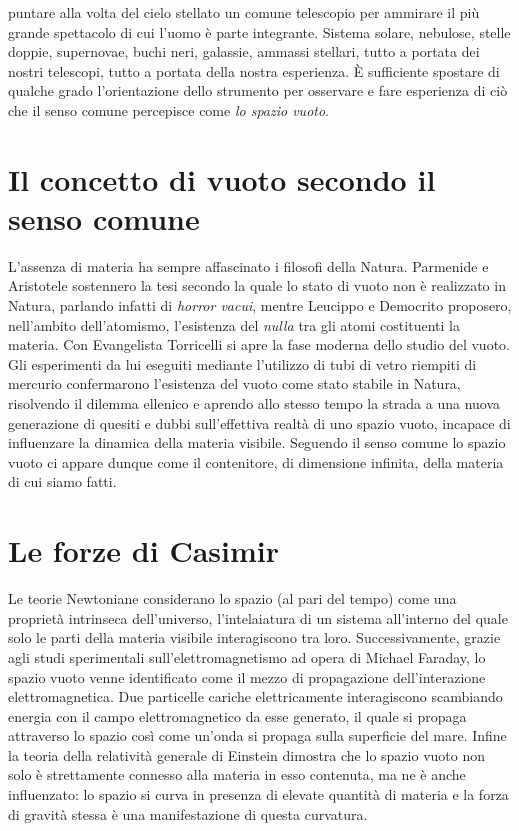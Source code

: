  puntare alla volta del cielo stellato un comune telescopio per ammirare il più grande spettacolo di cui l'uomo è parte integrante. Sistema solare, nebulose, stelle doppie, supernovae, buchi neri, galassie, ammassi stellari, tutto a portata dei nostri telescopi, tutto a portata della nostra esperienza. 
È sufficiente spostare di qualche grado l'orientazione dello strumento per osservare e fare esperienza di ciò che il senso comune percepisce come \emph{lo spazio vuoto}.

\section*{Il concetto di vuoto secondo il senso comune}
L'assenza di materia ha sempre affascinato i filosofi della Natura. Parmenide e Aristotele sostennero la tesi secondo la quale lo stato di vuoto non è realizzato in Natura, parlando infatti di \emph{horror vacui}, mentre Leucippo e Democrito proposero, nell'ambito dell'atomismo, l'esistenza del \emph{nulla} tra gli atomi costituenti la materia. Con Evangelista Torricelli si apre la fase moderna dello studio del vuoto. Gli esperimenti da lui eseguiti mediante l'utilizzo di tubi di vetro riempiti di mercurio confermarono l'esistenza del vuoto come stato stabile in Natura, risolvendo il dilemma ellenico e aprendo allo stesso tempo la strada a una nuova generazione di quesiti e dubbi sull'effettiva realtà di uno spazio vuoto, incapace di influenzare la dinamica della materia visibile. Seguendo il senso comune lo spazio vuoto ci appare dunque come il contenitore, di dimensione infinita, della materia di cui siamo fatti. 
    
\section*{Le forze di Casimir}
Le teorie Newtoniane considerano lo spazio (al pari del tempo) come una proprietà intrinseca dell'universo, l'intelaiatura di un sistema all'interno del quale solo le parti della materia visibile interagiscono tra loro. Successivamente, grazie agli studi sperimentali sull'elettromagnetismo ad opera di Michael Faraday, lo spazio vuoto venne identificato come il mezzo di propagazione dell'interazione elettromagnetica. Due particelle cariche elettricamente interagiscono scambiando energia con il campo elettromagnetico da esse generato, il quale si propaga attraverso lo spazio così come un'onda si propaga sulla superficie del mare. Infine la teoria della relatività generale di Einstein dimostra che lo spazio vuoto non solo è strettamente connesso alla materia in esso contenuta, ma ne è anche influenzato:
lo spazio si curva in presenza di elevate quantità di materia e la forza di gravità stessa è una manifestazione di questa curvatura.

